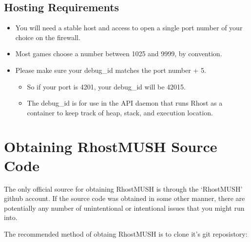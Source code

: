 \documentclass[letterpaper,10pt,english]{sphinxmanual}
\begin{document}
\subsection{Hosting Requirements}
\label{\detokenize{install:hosting-requirements}}\label{\detokenize{install:id5}}\begin{itemize}
\item {} 
\sphinxAtStartPar
You will need a stable host and access to open a single port number of your choice on the firewall.

\item {} 
\sphinxAtStartPar
Most games choose a number between 1025 and 9999, by convention.

\item {} 
\sphinxAtStartPar
Please make sure your debug\_id matches the port number + 5.
\begin{itemize}
\item {} 
\sphinxAtStartPar
So if your port is 4201, your debug\_id will be 42015.

\item {} 
\sphinxAtStartPar
The debug\_id is for use in the API daemon that runs Rhost as a container to keep track of heap, stack, and execution location.

\end{itemize}

\end{itemize}


\section{Obtaining RhostMUSH Source Code}
\label{\detokenize{install:obtaining-rhostmush-source-code}}\label{\detokenize{install:obtaining-rhostmush}}
\sphinxAtStartPar
The only official source for obtaining RhostMUSH is through the ‘RhostMUSH’
github account. If the source code was obtained in some other manner, there
are potentially any number of unintentional or intentional issues that you
might run into.

\sphinxAtStartPar
The recommended method of obtaing RhostMUSH is to clone it’s git reposistory:

\begin{sphinxVerbatim}[commandchars=\\\{\}]
   
\end{sphinxVerbatim}
\end{document}
